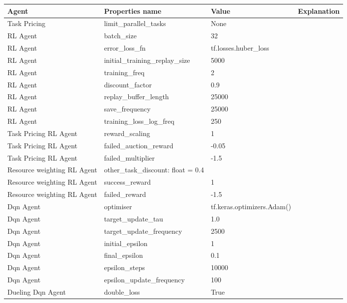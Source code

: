 \begin{longtable}{|p{3.5cm}|p{3.5cm}|p{3.5cm}|p{3.5cm}|} \hline
    \textbf{Agent} & \textbf{Properties name} & \textbf{Value} & \textbf{Explanation} \\ \hline
        Task Pricing & limit\_parallel\_tasks & None & \\ \hline
        RL Agent & batch\_size &  32 & \\ \hline
        RL Agent & error\_loss\_fn & tf.losses.huber\_loss & \\ \hline
        RL Agent & initial\_training\_replay\_size & 5000 & \\ \hline
        RL Agent & training\_freq & 2 & \\ \hline
        RL Agent & discount\_factor & 0.9 & \\ \hline
        RL Agent & replay\_buffer\_length & 25000 & \\ \hline
        RL Agent & save\_frequency & 25000 & \\ \hline
        RL Agent & training\_loss\_log\_freq & 250 & \\ \hline \hline
        Task Pricing RL Agent & reward\_scaling & 1 & \\ \hline
        Task Pricing RL Agent & failed\_auction\_reward & -0.05 & \\ \hline
        Task Pricing RL Agent & failed\_multiplier & -1.5 & \\ \hline \hline
        Resource weighting RL Agent & other\_task\_discount: float = 0.4 & \\ \hline
        Resource weighting RL Agent & success\_reward & 1 & \\ \hline
        Resource weighting RL Agent & failed\_reward & -1.5 & \\ \hline \hline
        Dqn Agent & optimiser & tf.keras.optimizers.Adam() & \\ \hline
        Dqn Agent & target\_update\_tau & 1.0 & \\ \hline
        Dqn Agent & target\_update\_frequency & 2500 & \\ \hline
        Dqn Agent & initial\_epsilon & 1 & \\ \hline
        Dqn Agent & final\_epsilon & 0.1 & \\ \hline
        Dqn Agent & epsilon\_steps & 10000 & \\ \hline
        Dqn Agent & epsilon\_update\_frequency & 100 & \\ \hline \hline
        Dueling Dqn Agent & double\_loss & True & \\ \hline \hline

\end{longtable}
